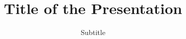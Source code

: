 \documentclass[xcolor=dvipsnames, aspectratio=169]{beamer}
\title{Title of the Presentation}
\subtitle{Subtitle}
\date{}
\author[]{}
\institute[]{\textbf{\projectName}}
\begin{document}
	
	\begin{frame}[t]
		\titlepage
	\end{frame}
    
    \begin{frame}
        \tableofcontents{}
    \end{frame}
\end{document}

